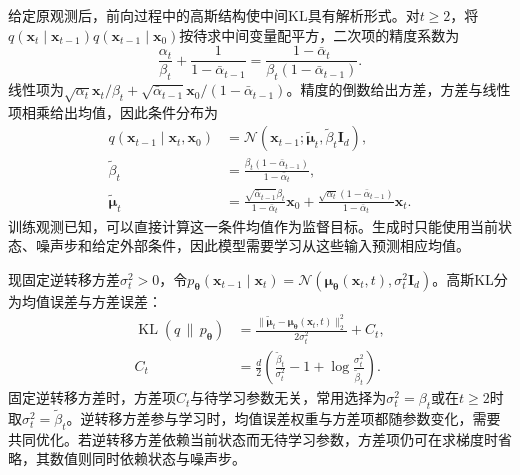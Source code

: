 给定原观测后，前向过程中的高斯结构使中间KL具有解析形式。对$t\geq2$，将$q(\bm{x}_t\mid\bm{x}_{t-1})q(\bm{x}_{t-1}\mid\bm{x}_0)$按待求中间变量配平方，二次项的精度系数为
\[
  \frac{\alpha_t}{\beta_t}
    +\frac{1}{1-\bar{\alpha}_{t-1}}
  =\frac{1-\bar{\alpha}_t}
          {\beta_t(1-\bar{\alpha}_{t-1})}.
\]
线性项为$\sqrt{\alpha_t}\bm{x}_t/\beta_t+\sqrt{\bar{\alpha}_{t-1}}\bm{x}_0/(1-\bar{\alpha}_{t-1})$。精度的倒数给出方差，方差与线性项相乘给出均值，因此条件分布为
\begin{equation}
  \label{eq:pgm-generative-forward-posterior}
  \begin{aligned}
    q(\bm{x}_{t-1}\mid\bm{x}_t,\bm{x}_0)
      &=\mathcal{N}(\bm{x}_{t-1};
          \widetilde{\bm{\mu}}_t,\widetilde{\beta}_t\bm{I}_d),\\
    \widetilde{\beta}_t
      &=\frac{\beta_t(1-\bar{\alpha}_{t-1})}
              {1-\bar{\alpha}_t},\\
    \widetilde{\bm{\mu}}_t
      &=\frac{\sqrt{\bar{\alpha}_{t-1}}\beta_t}
               {1-\bar{\alpha}_t}\bm{x}_0
       +\frac{\sqrt{\alpha_t}(1-\bar{\alpha}_{t-1})}
               {1-\bar{\alpha}_t}\bm{x}_t.
  \end{aligned}
\end{equation}
训练观测已知，可以直接计算这一条件均值作为监督目标。生成时只能使用当前状态、噪声步和给定外部条件，因此模型需要学习从这些输入预测相应均值。

现固定逆转移方差$\sigma_t^2>0$，令$p_{\bm{\theta}}(\bm{x}_{t-1}\mid\bm{x}_t)=\mathcal{N}(\bm{\mu}_{\bm{\theta}}(\bm{x}_t,t),\sigma_t^2\bm{I}_d)$。高斯KL分为均值误差与方差误差：
\begin{equation}
  \label{eq:pgm-generative-gaussian-step-kl}
  \begin{aligned}
    \operatorname{KL}(q\,\|\,p_{\bm{\theta}})
      &=\frac{\lVert\widetilde{\bm{\mu}}_t
                    -\bm{\mu}_{\bm{\theta}}(\bm{x}_t,t)\rVert_2^2}
               {2\sigma_t^2}+C_t,\\
    C_t&=\frac{d}{2}
       \left(\frac{\widetilde{\beta}_t}{\sigma_t^2}
              -1+\log\frac{\sigma_t^2}{\widetilde{\beta}_t}\right).
  \end{aligned}
\end{equation}
固定逆转移方差时，方差项$C_t$与待学习参数无关，常用选择为$\sigma_t^2=\beta_t$或在$t\geq2$时取$\sigma_t^2=\widetilde{\beta}_t$。逆转移方差参与学习时，均值误差权重与方差项都随参数变化，需要共同优化。若逆转移方差依赖当前状态而无待学习参数，方差项仍可在求梯度时省略，其数值则同时依赖状态与噪声步。

